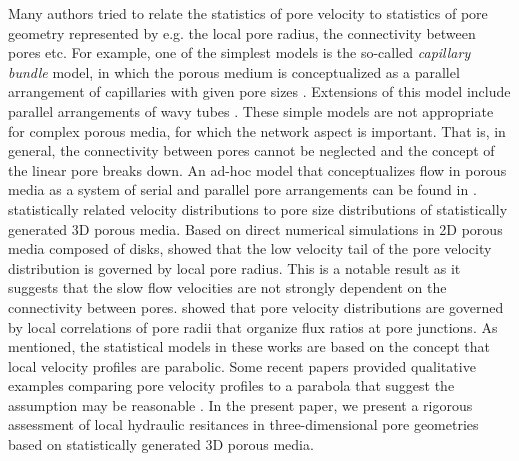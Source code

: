 \documentclass[draft]{agujournal2019}
\begin{document}
Many authors tried to relate the statistics of pore velocity to statistics of pore geometry represented by e.g. the local pore radius, the connectivity between pores etc. For example, one of the simplest models is the so-called \emph{capillary bundle} model, in which the porous medium is conceptualized as a parallel arrangement of capillaries with given pore sizes . Extensions of this model include parallel arrangements of wavy tubes . These simple models are not appropriate for complex porous media, for which the network aspect is important. That is, in general, the connectivity between pores cannot be neglected and the concept of the linear pore breaks down. An ad-hoc model that conceptualizes flow in porous media as a system of serial and parallel pore arrangements can be found in \cite{holzner_intermittent_2015}. \cite{siena_relationship_2014} statistically related velocity distributions to pore size distributions of statistically generated 3D porous media. Based on direct numerical simulations in 2D porous media composed of disks, \cite{de_anna_prediction_2017} showed that the low velocity tail of the pore velocity distribution is governed by local pore radius. This is a notable result as it suggests that the slow flow velocities are not strongly dependent on the connectivity between pores. \cite{alim_local_2017} showed that pore velocity distributions are governed by local correlations of pore radii that organize flux ratios at pore junctions. As mentioned, the statistical models in these works are based on the concept that local velocity profiles are parabolic. Some recent papers provided qualitative examples comparing pore velocity profiles to a parabola that suggest the assumption may be reasonable . In the present paper, we present a rigorous assessment of local hydraulic resitances in three-dimensional pore geometries based on statistically generated 3D porous media.
\end{document}
